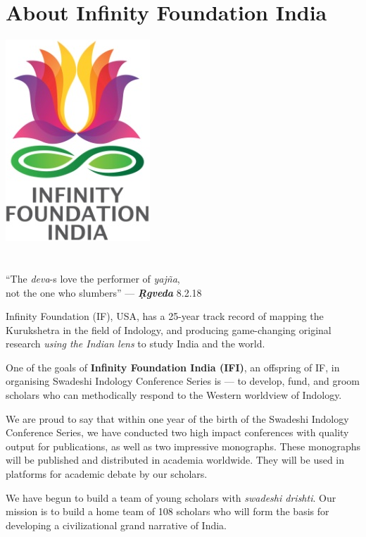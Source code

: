 
\chapter*{About Infinity Foundation India}\label{about}

\begin{center}
 \includegraphics[scale=0.23]{images/logo.png}\\\\\\
 “The \textit{deva}-s love the performer of \textit{yajña},\\ 
 not the one who slumbers” — \textbf{\textit{Ṛgveda}} 8.2.18
\end{center}

\vskip -10pt

Infinity Foundation (IF), USA, has a 25-year track record of mapping the Kurukshetra in the field of Indology, and producing game-changing original research \textit{using the Indian lens} to study India and the world.

One of the goals of \textbf{Infinity Foundation India (IFI)}, an offspring of IF, in organising Swadeshi Indology Conference Series is — to develop, fund, and groom scholars who can methodically respond to the Western worldview of Indology.

We are proud to say that within one year of the birth of the Swadeshi Indology Conference Series, we have conducted two high impact conferences with quality output for publications, as well as two impressive monographs. These monographs will be published and distributed in academia worldwide. They will be used in platforms for academic debate by our scholars.

We have begun to build a team of young scholars with \textit{swadeshi drishti}. Our mission is to build a home team of 108 scholars who will form the basis for developing a civilizational grand narrative of India.

